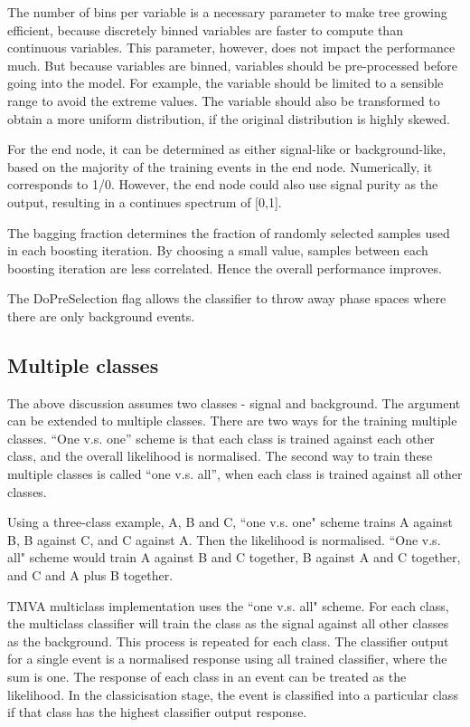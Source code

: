 The number of bins per variable is  a necessary parameter to make tree growing efficient, because discretely binned variables are faster to compute than continuous variables. This parameter, however,  does not impact the performance much. But because variables are binned, variables should be pre-processed before going into the model. For example, the variable should be limited to a sensible range to avoid the extreme values. The variable should also be transformed to obtain a more uniform distribution, if the original distribution is highly skewed.

For the end node, it can be determined as either signal-like or background-like, based on the majority of the training events in the end node. Numerically, it corresponds to 1/0. However, the end node could also use signal purity as the output, resulting in a continues spectrum of [0,1].

The bagging fraction determines the fraction of randomly selected samples used in each boosting iteration. By choosing a small value, samples between each boosting iteration are less correlated. Hence the overall performance improves.

The DoPreSelection flag allows the classifier to throw away phase spaces where there are only background events.

\subsection{Multiple classes}
\label{sec:pandoraMVAmulticlass}

The above discussion  assumes two classes - signal and background. The argument can be extended to multiple classes. There are two ways for the training multiple classes. ``One v.s. one'' scheme is that each class is trained against each other class, and the overall likelihood is normalised. The second way to train these multiple classes is called ``one v.s. all'', when each class is trained against all other classes.

Using a three-class example, A, B and C, ``one v.s. one" scheme trains A against B, B against C, and C against A. Then the likelihood is normalised. ``One v.s. all" scheme would train A against B and C together, B against A and C together, and C and A plus B together.

TMVA multiclass implementation uses the ``one v.s. all" scheme. For each class, the multiclass classifier will train the class as the signal against all other classes as the background. This process is repeated for each class. The classifier output for a single event is a normalised response using all trained classifier, where the sum is one. The response of each class in an event can be treated as the likelihood. In the classicisation stage, the event is classified into a particular class if that class has the highest classifier output response.

